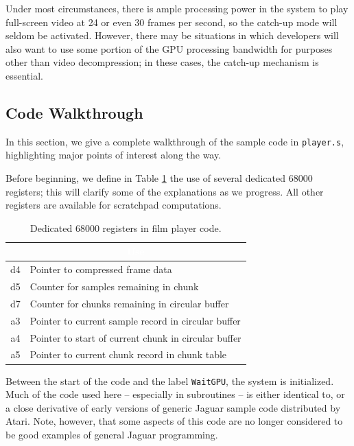 \documentclass[12pt,letterpaper,twoside]{article}
\newcommand{\tabheadtxt}[1]{\multicolumn{1}{c}{\textcolor{white}{\textbf{#1}}}}
\begin{document}
Under most circumstances, there is ample processing power in the system to play full-screen video at 24 or even 30 frames per second, so the catch-up mode will seldom be activated. However, there may be situations in which developers will also want to use some portion of the GPU processing bandwidth for purposes other than video decompression; in these cases, the catch-up mechanism is essential.

\subsection{Code Walkthrough}
In this section, we give a complete walkthrough of the sample code in \texttt{player.s}, highlighting major points of interest along the way.

Before beginning, we define in Table \ref{tab:registers} the use of several dedicated 68000 registers; this will clarify some of the explanations as we progress. All other registers are available for scratchpad computations.

\begin{table}[h]
\centering
\begin{tabular}{|c|p{12cm}|}
\hline
\rowcolor{black}
\tabheadtxt{Register} & \tabheadtxt{Use} \\
\hline
d4 & Pointer to compressed frame data \\
\hline
d5 & Counter for samples remaining in chunk \\
\hline
d7 & Counter for chunks remaining in circular buffer \\
\hline
a3 & Pointer to current sample record in circular buffer \\
\hline
a4 & Pointer to start of current chunk in circular buffer \\
\hline
a5 & Pointer to current chunk record in chunk table \\
\hline
\end{tabular}
\caption{Dedicated 68000 registers in film player code.}
\label{tab:registers}
\end{table}
\FloatBarrier

Between the start of the code and the label \texttt{WaitGPU}, the system is initialized. Much of the code used here -- especially in subroutines -- is either identical to, or a close derivative of early versions of generic Jaguar sample code distributed by Atari. Note, however, that some aspects of this code are no longer considered to be good examples of general Jaguar programming.
\end{document}
